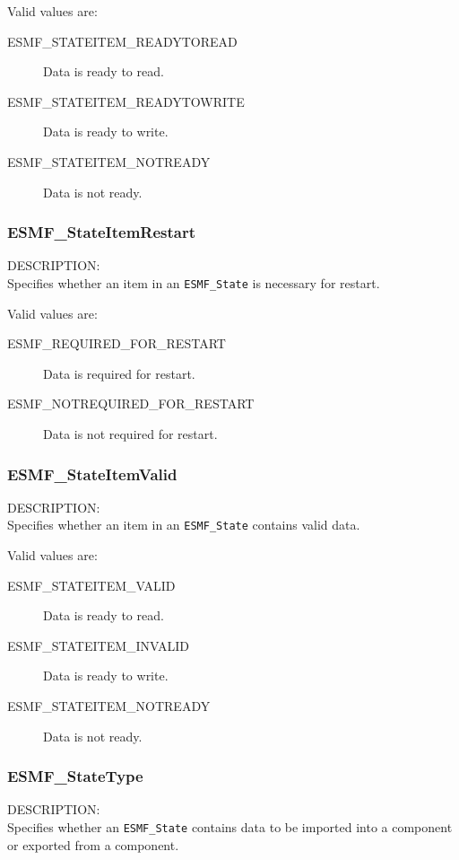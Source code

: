Valid values are:
\begin{description}
   \item [ESMF\_STATEITEM\_READYTOREAD] 
         Data is ready to read.
   \item [ESMF\_STATEITEM\_READYTOWRITE]
         Data is ready to write.
   \item [ESMF\_STATEITEM\_NOTREADY]
         Data is not ready.
\end{description}

\subsubsection{ESMF\_StateItemRestart}
\label{opt:stateitemrestart}
{\sf DESCRIPTION:\\}
Specifies whether an item in an {\tt ESMF\_State} is necessary
for restart.

Valid values are:
\begin{description}
   \item [ESMF\_REQUIRED\_FOR\_RESTART] 
         Data is required for restart.
   \item [ESMF\_NOTREQUIRED\_FOR\_RESTART]
         Data is not required for restart.
\end{description}

\subsubsection{ESMF\_StateItemValid}
\label{opt:stateitemvalid}
{\sf DESCRIPTION:\\}
Specifies whether an item in an {\tt ESMF\_State} contains valid data.

Valid values are:
\begin{description}
   \item [ESMF\_STATEITEM\_VALID] 
         Data is ready to read.
   \item [ESMF\_STATEITEM\_INVALID]
         Data is ready to write.
   \item [ESMF\_STATEITEM\_NOTREADY]
         Data is not ready.
\end{description}

\subsubsection{ESMF\_StateType}
\label{opt:statetype}
{\sf DESCRIPTION:\\}
Specifies whether an {\tt ESMF\_State} contains data to be imported
into a component or exported from a component. 

